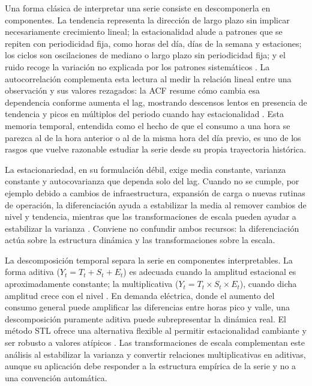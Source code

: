 Una forma clásica de interpretar una serie consiste en descomponerla en componentes. La tendencia representa la dirección de largo plazo sin implicar necesariamente crecimiento lineal; la estacionalidad alude a patrones que se repiten con periodicidad fija, como horas del día, días de la semana y estaciones; los ciclos son oscilaciones de mediano o largo plazo sin periodicidad fija; y el ruido recoge la variación no explicada por los patrones sistemáticos \parencite{hyndman2021}. La autocorrelación complementa esta lectura al medir la relación lineal entre una observación y sus valores rezagados: la ACF resume cómo cambia esa dependencia conforme aumenta el lag, mostrando descensos lentos en presencia de tendencia y picos en múltiplos del periodo cuando hay estacionalidad \parencite{hyndman2021,box2015}. Esta memoria temporal, entendida como el hecho de que el consumo a una hora se parezca al de la hora anterior o al de la misma hora del día previo, es uno de los rasgos que vuelve razonable estudiar la serie desde su propia trayectoria histórica.

La estacionariedad, en su formulación débil, exige media constante, varianza constante y autocovarianza que dependa solo del lag. Cuando no se cumple, por ejemplo debido a cambios de infraestructura, expansión de carga o nuevas rutinas de operación, la diferenciación ayuda a estabilizar la media al remover cambios de nivel y tendencia, mientras que las transformaciones de escala pueden ayudar a estabilizar la varianza \parencite{hyndman2021,box2015}. Conviene no confundir ambos recursos: la diferenciación actúa sobre la estructura dinámica y las transformaciones sobre la escala.

La descomposición temporal separa la serie en componentes interpretables. La forma aditiva (\(Y_t = T_t + S_t + E_t\)) es adecuada cuando la amplitud estacional es aproximadamente constante; la multiplicativa (\(Y_t = T_t \times S_t \times E_t\)), cuando dicha amplitud crece con el nivel \parencite{hyndman2021}. En demanda eléctrica, donde el aumento del consumo general puede amplificar las diferencias entre horas pico y valle, una descomposición puramente aditiva puede subrepresentar la dinámica real. El método STL ofrece una alternativa flexible al permitir estacionalidad cambiante y ser robusto a valores atípicos \parencite{hyndman2021}. Las transformaciones de escala complementan este análisis al estabilizar la varianza y convertir relaciones multiplicativas en aditivas, aunque su aplicación debe responder a la estructura empírica de la serie y no a una convención automática.

